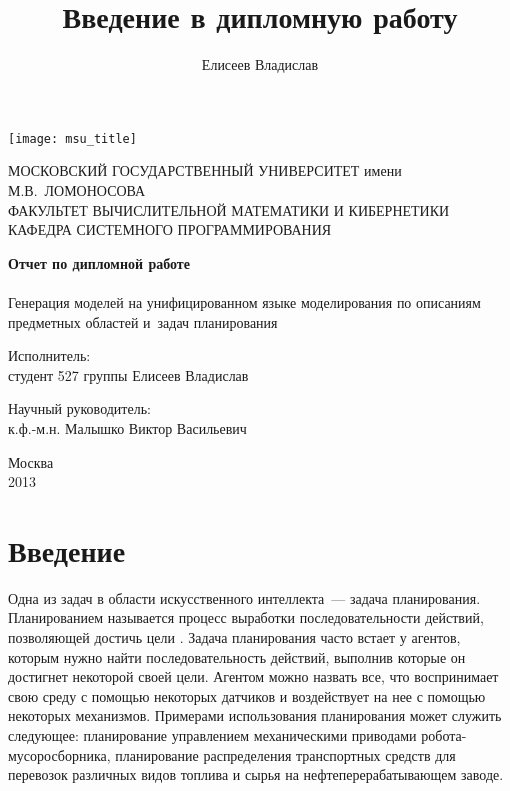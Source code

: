 \documentclass[a4paper,14pt]{extreport}
\title{Введение в дипломную работу}
\author{Елисеев Владислав}
\begin{document}
\begin{titlepage}

\begin{center}

\texttt{[image: msu\_title]}

{\small
МОСКОВСКИЙ ГОСУДАРСТВЕННЫЙ УНИВЕРСИТЕТ имени М.В.~ЛОМОНОСОВА \\
ФАКУЛЬТЕТ ВЫЧИСЛИТЕЛЬНОЙ МАТЕМАТИКИ И КИБЕРНЕТИКИ \\
КАФЕДРА СИСТЕМНОГО ПРОГРАММИРОВАНИЯ
}
\end{center}

\vfill
\vfill
\begin{center}
\Large{\textbf{Отчет по дипломной работе}} \\
~\\
\Large{Генерация моделей на унифицированном языке моделирования по описаниям предметных областей и~задач планирования}
\end{center}
\vfill
\vfill
\vfill
\vfill
\begin{flushright}
Исполнитель: \\
студент 527 группы Елисеев Владислав
\end{flushright}
\vfill
\begin{flushright}
Научный руководитель: \\
к.ф.-м.н. Малышко Виктор Васильевич
\end{flushright}
  
\vfill
\vfill
\vfill
\vfill
\begin{center}
  Москва\\
  2013
\end{center}  
\end{titlepage}



\setcounter{page}{1}
\linespread{1}
\normalsize

\section*{Введение}
	Одна из задач в области искусственного интеллекта~--- задача планирования. Планированием называется процесс выработки последовательности действий, позволяющей достичь цели \cite{norwig-ai}. Задача планирования часто встает у агентов, которым нужно найти последовательность действий, выполнив которые он достигнет некоторой своей цели. Агентом можно назвать все, что воспринимает свою среду с помощью некоторых датчиков и воздействует на нее с помощью некоторых механизмов. Примерами использования планирования может служить следующее: планирование управлением механическими приводами робота-мусоросборника, планирование распределения транспортных средств для перевозок различных видов топлива и сырья на нефтеперерабатывающем заводе. 
\end{document}
